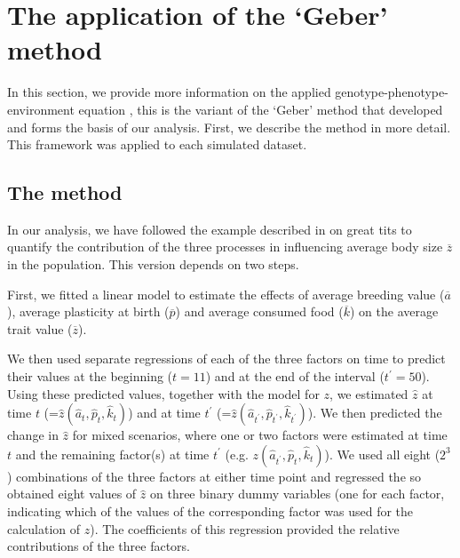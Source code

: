 \section{The application of the `Geber' method}
\label{app:gpe2}
In this section, we provide more information on the applied genotype-phenotype-environment equation \parencite{Ellner2011,Hairston2005}, this is the variant of the `Geber' method that \cite{Ellner2011} developed and forms the basis of our analysis. First, we describe the method in more detail. This framework was applied to each simulated dataset.

\subsection{The method} \label{app:gpe2:eq}
In our analysis, we have followed the example described in \cite{Ellner2011} on great tits to quantify the contribution of the three processes in influencing average body size $\overline z$ in the population. This version depends on two steps. 

First, we fitted a linear model to estimate the effects of average breeding value ($\overline a$), average plasticity at birth ($\overline p$) and average consumed food ($\overline k$) on the average trait value ($\overline z$). 

We then used separate regressions of each of the three factors on time to predict their values at the beginning ($t=11$) and at the end of the interval ($t^\prime=50$). Using these predicted values, together with the model for $z$, we estimated $\hat z$ at time $t$ (=$\hat z(\hat{a}_t,\hat{p}_t,\hat{k}_t)$) and at time $t^\prime$ (=$\hat{z}(\hat{a}_{t^\prime},\hat{p}_{t^\prime},\hat{k}_{t^\prime})$). We then predicted the change in $\hat{z}$ for mixed scenarios, where one or two factors were estimated at time $t$ and the remaining factor(s) at time $t^\prime$ (e.g. $z(\hat{a}_{t^\prime},\hat{p}_{t},\hat{k}_{t})$). We used all eight ($2^3$) combinations of the three factors at either time point and regressed the so obtained eight values of $\hat z$ on three binary dummy variables (one for each factor, indicating which of the values of the corresponding factor was used for the calculation of $z$). The coefficients of this regression provided the relative contributions of the three factors.

